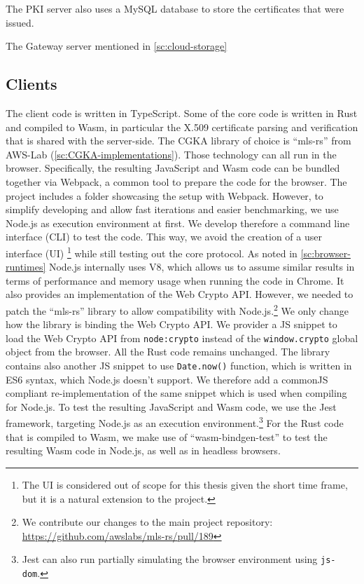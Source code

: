 The PKI server also uses a MySQL database to store the certificates that were issued.

The Gateway server mentioned in \cref{sc:cloud-storage}



\subsection{Clients}

The client code is written in TypeScript.
Some of the core code is written in Rust and compiled to Wasm,
in particular the X.509 certificate parsing and verification
that is shared with the server-side.
The CGKA library of choice is ``mls-rs'' from AWS-Lab (\cref{sc:CGKA-implementations}).
Those technology can all run in the browser. Specifically,
the resulting JavaScript and Wasm code can be bundled
together via Webpack, a common tool to prepare
the code for the browser.
The project includes a folder showcasing the setup with
Webpack.
However, to simplify developing and allow fast iterations and easier benchmarking,
we use Node.js as execution environment at first.
We develop therefore a command line interface (CLI) to test the code.
This way, we avoid the creation of a user
interface (UI)
\footnote{The UI is considered out of scope for this thesis given the short time frame, but it is a natural extension to the project.}
while still testing out the core protocol. 
As noted in \cref{sc:browser-runtimes}
Node.js internally uses V8, which allows us to assume
similar results in terms of performance and memory usage
when running the code in Chrome. It also provides
an implementation of the Web Crypto API.
However, we needed to patch the ``mls-rs'' library
to allow compatibility with Node.js.\footnote{We contribute our changes to the main project repository: \url{https://github.com/awslabs/mls-rs/pull/189}}
We only change how the library is binding the Web Crypto API.
We provider a JS snippet to load the Web Crypto API from
\texttt{node:crypto} instead of the \texttt{window.crypto} global
object from the browser. All the Rust code remains
unchanged. The library contains also another JS snippet
to use \texttt{Date.now()} function, which is written in
ES6 syntax, which Node.js doesn't support.
We therefore add a commonJS compliant re-implementation
of the same snippet which is used
when compiling for Node.js.
To test the resulting JavaScript and Wasm code, we use the Jest~\cite{Jest}
framework, targeting Node.js as an execution environment.\footnote{Jest can also run partially simulating the browser environment using \texttt{js-dom}.}
For the Rust code that is compiled to Wasm, we make use of
``wasm-bindgen-test'' to test the resulting Wasm code in 
Node.js, as well as in headless browsers.






